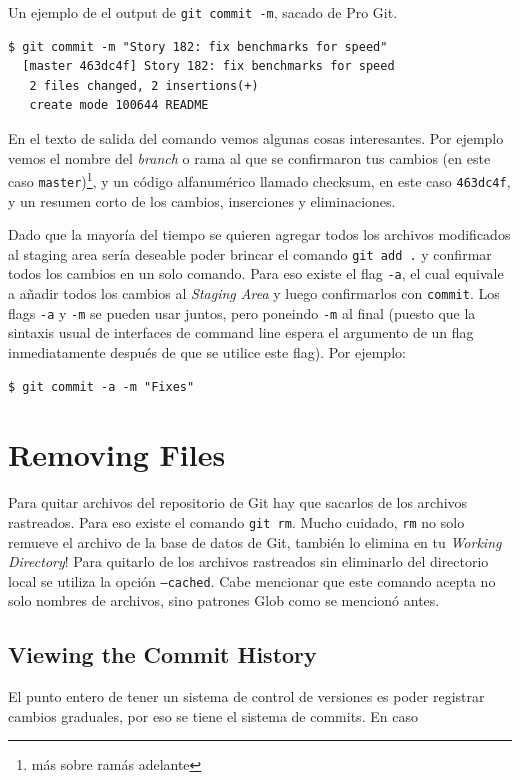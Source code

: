 \documentclass[spanish, 12pt, a4paper]{article}
\begin{document}
Un ejemplo de el output de \texttt{git commit -m}, sacado de Pro Git.
\begin{lstlisting}
$ git commit -m "Story 182: fix benchmarks for speed"
  [master 463dc4f] Story 182: fix benchmarks for speed
   2 files changed, 2 insertions(+)
   create mode 100644 README
\end{lstlisting}

En el texto de salida del comando vemos algunas cosas interesantes.
Por ejemplo vemos el nombre del \textit{branch} o rama al que se confirmaron tus cambios (en este caso \texttt{master})\footnote{más sobre ramás adelante}, y un código alfanumérico llamado checksum, en este caso \texttt{463dc4f}, y un resumen corto de los cambios, inserciones y eliminaciones.

Dado que la mayoría del tiempo se quieren agregar todos los archivos modificados al staging area sería deseable poder brincar el comando \texttt{git add .} y confirmar todos los cambios en un solo comando.
Para eso existe el flag \texttt{-a}, el cual equivale a añadir todos los cambios al \textit{Staging Area} y luego confirmarlos con \texttt{commit}.
Los flags \texttt{-a} y \texttt{-m} se pueden usar juntos, pero poneindo \texttt{-m} al final (puesto que la sintaxis usual de interfaces de command line espera el argumento de un flag inmediatamente después de que se utilice este flag).
Por ejemplo:
\begin{lstlisting}
$ git commit -a -m "Fixes"
\end{lstlisting}

\section{Removing Files}
Para quitar archivos del repositorio de Git hay que sacarlos de los archivos rastreados.
Para eso existe el comando \texttt{git rm}.
Mucho cuidado, \texttt{rm} no solo remueve el archivo de la base de datos de Git, también lo elimina en tu \textit{Working Directory}!
Para quitarlo de los archivos rastreados sin eliminarlo del directorio local se utiliza la opción \texttt{--cached}.
Cabe mencionar que este comando acepta no solo nombres de archivos, sino patrones Glob como se mencionó antes.

\subsection{Viewing the Commit History}
El punto entero de tener un sistema de control de versiones es poder registrar cambios graduales, por eso se tiene el sistema de commits.
En caso 
\end{document}
